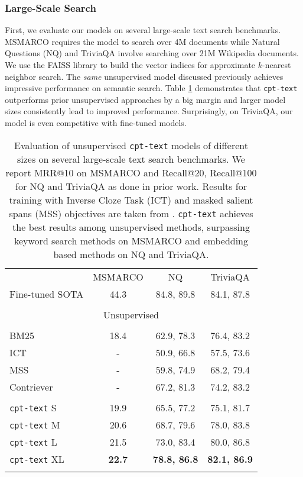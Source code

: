 \documentclass[nohyperref]{article}
\begin{document}
\subsubsection{Large-Scale Search}
\label{sec:large}

First, we evaluate our models on several large-scale text search benchmarks. MSMARCO \cite{msmarco} requires the model to search over 4M documents while Natural Questions (NQ) \cite{nq} and TriviaQA \cite{trivia} involve searching over 21M Wikipedia documents. We use the FAISS library \cite{Johnson} to build the vector indices for approximate $k$-nearest neighbor search. The \textit{same} unsupervised model discussed previously achieves impressive performance on semantic search. Table \ref{table:large} demonstrates that \texttt{cpt-text} outperforms prior unsupervised approaches by a big margin and larger model sizes consistently lead to improved performance. Surprisingly, on TriviaQA, our model is even competitive with fine-tuned models.

\begin{table}[]
\setlength{\tabcolsep}{4.5pt}
\centering
\begin{tabular}{lccc}
& MSMARCO  & NQ & TriviaQA  \\ 
\Xhline{2.5\arrayrulewidth}
Fine-tuned SOTA  & 44.3 & 84.8, 89.8  & 84.1, 87.8 \\
\Xhline{2.5\arrayrulewidth} \\[-1.5ex]
\multicolumn{4}{c}{Unsupervised} \\ 
\Xhline{1\arrayrulewidth} \\[-1.5ex]
BM25 & 18.4 & 62.9, 78.3 & 76.4, 83.2 \\
ICT & - & 50.9, 66.8 & 57.5, 73.6 \\
MSS & - & 59.8, 74.9 & 68.2, 79.4 \\
Contriever & - & 67.2, 81.3 & 74.2, 83.2 \\
\Xhline{1\arrayrulewidth} \\[-1.5ex]
\texttt{cpt-text} S & 19.9 & 65.5, 77.2 & 75.1, 81.7 \\
\texttt{cpt-text} M & 20.6 & 68.7, 79.6 & 78.0, 83.8 \\
\texttt{cpt-text} L & 21.5 & 73.0, 83.4 & 80.0, 86.8 \\
\texttt{cpt-text} XL & \textbf{22.7} & \textbf{78.8, 86.8} & \textbf{82.1, 86.9} \\
\Xhline{2.5\arrayrulewidth}        
\end{tabular}
\caption{Evaluation of unsupervised \texttt{cpt-text} models of different sizes on several large-scale text search benchmarks. We report MRR@10 on MSMARCO and Recall@20, Recall@100 for NQ and TriviaQA as done in prior work. Results for training with Inverse Cloze Task (ICT) and masked salient spans (MSS) objectives are taken from \citet{e2e}. \texttt{cpt-text} achieves the best results among unsupervised methods, surpassing keyword search methods on MSMARCO \cite{bm25} and embedding based methods \cite{contreiver} on NQ and TriviaQA.}
\label{table:large}
\end{table}
\end{document}
